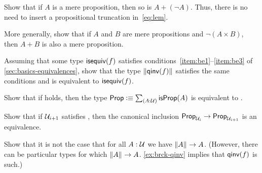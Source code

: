 \begin{ex}\label{ex:lem-mereprop}
  Show that if $A$ is a mere proposition, then so is $A+(\neg A)$.
  Thus, there is no need to insert a propositional truncation in~\eqref{eq:lem}.
\end{ex}

\begin{ex}\label{ex:disjoint-or}
  More generally, show that if $A$ and $B$ are mere propositions and $\neg(A\times B)$, then $A+B$ is also a mere proposition.
\end{ex}




\begin{ex}\label{ex:brck-qinv}
  Assuming that some type $\mathsf{isequiv}(f)$ satisfies conditions~\ref{item:be1}--\ref{item:be3} of \autoref{sec:basics-equivalences}, show that the type $\mathopen{}\left\Vert \mathsf{qinv}(f)\right\Vert_{}\mathclose{}$ satisfies the same conditions and is equivalent to $\mathsf{isequiv}(f)$.
\end{ex}

\begin{ex}
  Show that if \LEM{} holds, then the type $\prop \defeq \sm{A:\type} \isprop(A)$ is equivalent to \bool.
\end{ex}

\begin{ex}\label{ex:lem-impred}
  Show that if $\mathcal{U}_{i+1}$ satisfies \LEM{}, then the canonical inclusion $\mathsf{Prop}_{\mathcal{U}_i} \to \mathsf{Prop}_{\mathcal{U}_{i+1}}$ is an equivalence.
\end{ex}

\begin{ex}
  Show that it is not the case that for all $A:\mathcal{U}$ we have $\mathopen{}\left\Vert A\right\Vert_{}\mathclose{} \to A$.
  (However, there can be particular types for which $\mathopen{}\left\Vert A\right\Vert_{}\mathclose{}\to A$.
  \autoref{ex:brck-qinv} implies that $\mathsf{qinv}(f)$ is such.)
\end{ex}

